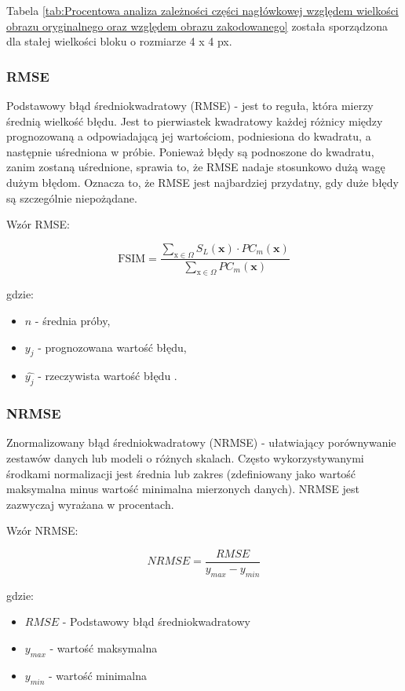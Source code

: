 \documentclass{article}
\begin{document}
Tabela \ref{tab:Procentowa analiza zależności części nagłówkowej względem wielkości obrazu oryginalnego oraz względem obrazu zakodowanego} została sporządzona dla stałej wielkości bloku o rozmiarze 4 x 4 px.

\subsubsection{RMSE}

Podstawowy błąd średniokwadratowy (RMSE) - jest to reguła, która mierzy średnią wielkość błędu. Jest to pierwiastek kwadratowy każdej różnicy między prognozowaną a odpowiadającą jej wartościom, podniesiona do kwadratu, a następnie uśredniona w próbie. Ponieważ błędy są podnoszone do kwadratu, zanim zostaną uśrednione, sprawia to, że RMSE nadaje stosunkowo dużą wagę dużym błędom. Oznacza to, że RMSE jest najbardziej przydatny, gdy duże błędy są szczególnie niepożądane.

Wzór RMSE:

\begin{equation}
  \mathrm{FSIM}=\frac{\sum_{\mathrm{x} \in \Omega} S_{L}(\mathbf{x}) \cdot P C_{m}(\mathbf{x})}{\sum_{\mathrm{x} \in \Omega} P C_{m}(\mathbf{x})}
\end{equation}

gdzie:
\begin{itemize}[label=]
  \item $n$ - średnia próby,
  \item $y_{j}$ - prognozowana wartość błędu,
  \item $\hat{y_{j}}$ - rzeczywista wartość błędu \cite{rmse}.
\end{itemize}

\subsubsection{NRMSE}

Znormalizowany błąd średniokwadratowy (NRMSE) - ułatwiający porównywanie zestawów danych lub modeli o różnych skalach. Często wykorzystywanymi środkami normalizacji jest średnia lub zakres (zdefiniowany jako wartość maksymalna minus wartość minimalna mierzonych danych). NRMSE jest zazwyczaj wyrażana w procentach.

Wzór NRMSE:

\begin{equation}
  NRMSE = \frac{RMSE}{y_{max} - y_{min}}
\end{equation}

gdzie:
\begin{itemize}[label=]
  \item $RMSE$ - Podstawowy błąd średniokwadratowy
  \item $y_{max}$ - wartość maksymalna
  \item $y_{min}$ - wartość minimalna
\end{itemize}
\end{document}
